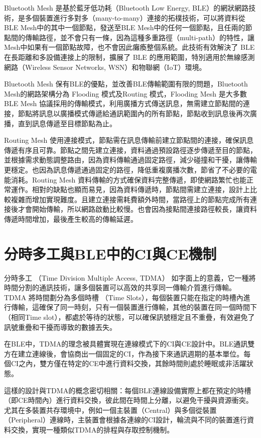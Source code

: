 \begin{ZhChapter}
Bluetooth Mesh 是基於藍牙低功耗（Bluetooth Low Energy, BLE）的網狀網路技術，是多個裝置進行多對多（many-to-many）連接的拓樸技術，可以將資料從BLE Mesh中的其中一個節點，發送至BLE Mesh中的任何一個節點，且任兩的節點間的傳輸路徑，並不會只有一條，因為這種多重路徑（multi-path）的特性，讓Mesh中如果有一個節點故障，也不會因此癱瘓整個系統。此技術有效解決了 BLE 在長距離和多設備連接上的限制，擴展了 BLE 的應用範圍，特別適用於無線感測網路（Wireless Sensor Networks, WSN）和物聯網（IoT）環境。

Bluetooth Mesh 保有BLE的優點，並改善BLE傳輸範圍有限的問題，Bluetooth Mesh的網路架構分為 Flooding 模式及Routing 模式，Flooding Mesh 是大多數 BLE Mesh 協議採用的傳輸模式，利用廣播方式傳送訊息，無需建立節點間的連接，節點將訊息以廣播模式傳遞給通訊範圍內的所有節點，節點收到訊息後再次廣播，直到訊息傳遞至目標節點為止。

Routing Mesh 使用連接模式，節點需在訊息傳輸前建立節點間的連接，確保訊息傳遞有序且可靠。節點之間先建立連接，資料通過預設路徑逐步傳遞至目的節點，並根據需求動態調整路由，因為資料傳輸通過固定路徑，減少碰撞和干擾，讓傳輸更穩定。也因為訊息傳遞通過固定的路徑，降低重複廣播次數，節省了不必要的電能消耗。Routing Mesh 資料傳輸的方式確保資料完整傳遞，即使網路繁忙也能正常運作。相對的缺點也顯而易見，因為資料傳遞時，節點間需建立連接，設計上比較複雜而增加實現難度。且建立連接需耗費額外時間，當路徑上的節點完成所有連接後才會開始傳輸，所以網路啟動比較慢。也會因為接點間連接路徑較長，讓資料傳遞時間增加，最後產生較高的傳輸延遲。

\section{分時多工與BLE中的CI與CE機制}

分時多工 （Time Division Multiple Access, TDMA） 如字面上的意義，它一種將時間分割的通訊技術，讓多個裝置可以高效的共享同一傳輸介質進行傳輸。TDMA 將時間劃分為多個時槽 （Time Slots），每個裝置只能在指定的時槽內進行傳輸，這確保了同一時刻，只有一個裝置進行傳輸，其他的裝置在同一個時間下（相同Time slot），都處於等待的狀態，可以確保訊號穩定且不重疊，有效避免了訊號重疊和干擾而導致的數據丟失。

在BLE中，TDMA的理念被具體實現在連線模式下的CI與CE設計中。BLE通訊雙方在建立連線後，會協商出一個固定的CI，作為接下來通訊週期的基本單位。每個CI之內，雙方僅在特定的CE中進行資料交換，其餘時間則處於睡眠或非活躍狀態。

這樣的設計與TDMA的概念密切相關：每個BLE連線設備實際上都在預定的時槽（即CE時間內）進行資料交換，彼此間在時間上分離，以避免干擾與資源衝突。尤其在多裝置共存環境中，例如一個主裝置（Central）與多個從裝置（Peripheral）連線時，主裝置會根據各連線的CI設計，輪流與不同的裝置進行資料交換，實現一種類似TDMA的排程與存取控制機制。


\end{ZhChapter}
